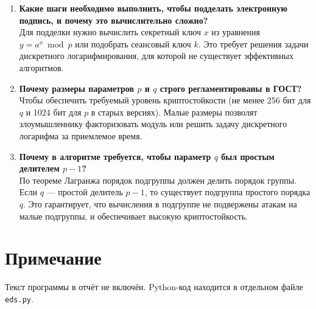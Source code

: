 \documentclass[12pt]{article}
\begin{document}
\begin{enumerate}
    \item \textbf{Какие шаги необходимо выполнить, чтобы подделать электронную подпись, и почему это вычислительно сложно?} \\
    Для подделки нужно вычислить секретный ключ \(x\) из уравнения \(y = a^x \bmod p\) или подобрать сеансовый ключ \(k\). Это требует решения задачи дискретного логарифмирования, для которой не существует эффективных алгоритмов.

    \item \textbf{Почему размеры параметров \(p\) и \(q\) строго регламентированы в ГОСТ?} \\
    Чтобы обеспечить требуемый уровень криптостойкости (не менее 256 бит для \(q\) и 1024 бит для \(p\) в старых версиях). Малые размеры позволят злоумышленнику факторизовать модуль или решить задачу дискретного логарифма за приемлемое время.

    \item \textbf{Почему в алгоритме требуется, чтобы параметр \(q\) был простым делителем \(p-1\)?} \\
    По теореме Лагранжа порядок подгруппы должен делить порядок группы. Если \(q\) — простой делитель \(p-1\), то существует подгруппа простого порядка \(q\). Это гарантирует, что вычисления в подгруппе не подвержены атакам на малые подгруппы, и обеспечивает высокую криптостойкость.
\end{enumerate}

\section*{Примечание}
Текст программы в отчёт не включён. Python-код находится в отдельном файле \texttt{eds.py}.
\end{document}
